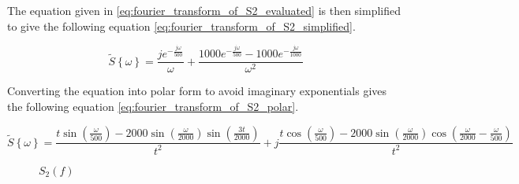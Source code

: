 The equation given in \eqref{eq:fourier_transform_of_S2_evaluated} is then simplified to give the following equation \eqref{eq:fourier_transform_of_S2_simplified}.

\begin{equation}
	\widetilde{S} \left\{\omega\right\} = \frac{je^{-\frac{j\omega}{500}}}{\omega}+\frac{1000e^{-\frac{j\omega}{500}}-1000e^{-\frac{j\omega}{1000}}}{\omega^2}\label{eq:fourier_transform_of_S2_simplified}
\end{equation}

Converting the equation into polar form to avoid imaginary exponentials gives the following equation \eqref{eq:fourier_transform_of_S2_polar}.

\begin{equation}
		\widetilde{S} \left\{\omega\right\} = \frac{t\sin \left(\frac\omega{500}\right)-2000\sin \left(\frac\omega{2000}\right)\sin \left(\frac{3t}{2000}\right)}{t^2}+j\frac{t\cos \left(\frac\omega{500}\right)-2000\sin \left(\frac\omega{2000}\right)\cos \left(\frac\omega{2000}-\frac\omega{500}\right)}{t^2}
	\label{eq:fourier_transform_of_S2_polar}
\end{equation}

\begin{figure}[ht!]
	\centering
	
	\caption{$S_2\left(f\right)$}\label{fig:s2f} 
\end{figure}\FloatBarrier 

